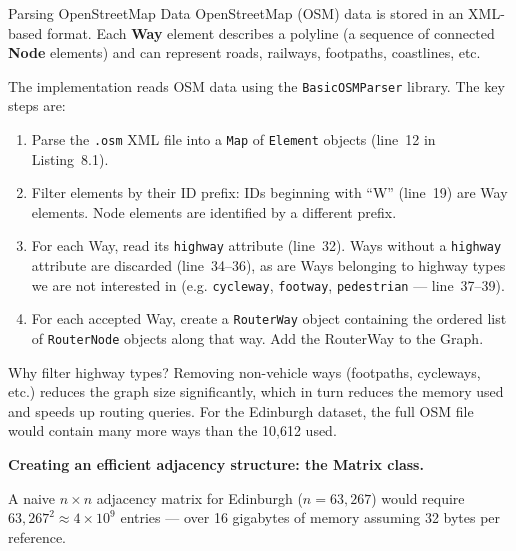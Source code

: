 \documentclass[aspectratio=169,10pt]{beamer}
\begin{document}
\begin{frame}[allowframebreaks]{Parsing OpenStreetMap Data}
  OpenStreetMap (OSM) data is stored in an XML-based format.  Each
  \textbf{Way} element describes a polyline (a sequence of connected
  \textbf{Node} elements) and can represent roads, railways, footpaths,
  coastlines, etc.

  \medskip
  The implementation reads OSM data using the \texttt{BasicOSMParser}
  library.  The key steps are:

  \begin{enumerate}
    \item Parse the \texttt{.osm} XML file into a \texttt{Map} of
      \texttt{Element} objects (line~12 in Listing~8.1).
    \item Filter elements by their ID prefix: IDs beginning with ``W''
      (line~19) are Way elements.  Node elements are identified by a
      different prefix.
    \item For each Way, read its \texttt{highway} attribute (line~32).
      Ways without a \texttt{highway} attribute are discarded (line~34--36),
      as are Ways belonging to highway types we are not interested in (e.g.
      \texttt{cycleway}, \texttt{footway}, \texttt{pedestrian} ---
      line~37--39).
    \item For each accepted Way, create a \texttt{RouterWay} object
      containing the ordered list of \texttt{RouterNode} objects along
      that way.  Add the RouterWay to the Graph.
  \end{enumerate}

  \begin{block}{Why filter highway types?}
    Removing non-vehicle ways (footpaths, cycleways, etc.) reduces the
    graph size significantly, which in turn reduces the memory used and
    speeds up routing queries.  For the Edinburgh dataset, the full OSM
    file would contain many more ways than the 10,612 used.
  \end{block}

  \framebreak

  \textbf{Creating an efficient adjacency structure: the Matrix class.}

  A naive $n \times n$ adjacency matrix for Edinburgh ($n = 63,\!267$)
  would require $63,\!267^2 \approx 4 \times 10^9$ entries --- over 16
  gigabytes of memory assuming 32 bytes per reference.


\end{frame}
\end{document}
